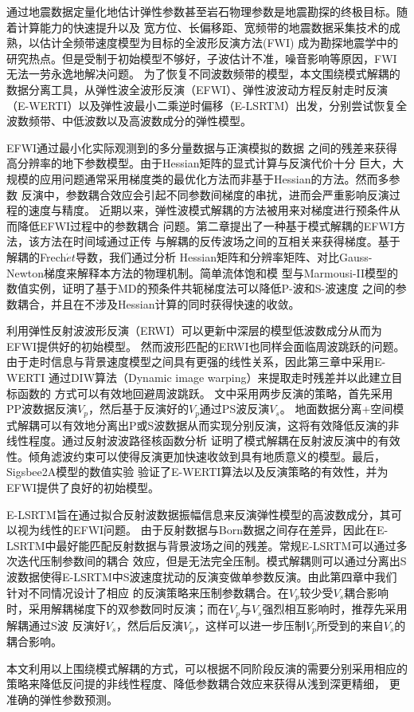 \begin{cabstract}
	通过地震数据定量化地估计弹性参数甚至岩石物理参数是地震勘探的终极目标。随着计算能力的快速提升以及
	宽方位、长偏移距、宽频带的地震数据采集技术的成熟，以估计全频带速度模型为目标的全波形反演方法(FWI)
	成为勘探地震学中的研究热点。但是受制于初始模型不够好，子波估计不准，噪音影响等原因，FWI无法一劳永逸地解决问题。
	为了恢复不同波数频带的模型，本文围绕模式解耦的数据分离工具，从弹性波全波形反演（EFWI）、弹性波波动方程反射走时反演
	（E-WERTI）以及弹性波最小二乘逆时偏移（E-LSRTM）出发，分别尝试恢复全波数频带、中低波数以及高波数成分的弹性模型。

	EFWI通过最小化实际观测到的多分量数据与正演模拟的数据
	之间的残差来获得高分辨率的地下参数模型。由于Hessian矩阵的显式计算与反演代价十分
	巨大，大规模的应用问题通常采用梯度类的最优化方法而非基于Hessian的方法。然而多参数
	反演中，参数耦合效应会引起不同参数间梯度的串扰，进而会严重影响反演过程的速度与精度。
	近期以来，弹性波模式解耦的方法被用来对梯度进行预条件从而降低EFWI过程中的参数耦合
	问题。第二章提出了一种基于模式解耦的EFWI方法，该方法在时间域通过正传
	与解耦的反传波场之间的互相关来获得梯度。基于解耦的Frech$\acute{e}t$导数，我们通过分析
	Hessian矩阵和分辨率矩阵、对比Gauss-Newton梯度来解释本方法的物理机制。简单流体饱和模
	型与Marmousi-II模型的数值实例，证明了基于MD的预条件共轭梯度法可以降低P-波和S-波速度
	之间的参数耦合，并且在不涉及Hessian计算的同时获得快速的收敛。

	利用弹性反射波波形反演（ERWI）可以更新中深层的模型低波数成分从而为EFWI提供好的初始模型。
	然而波形匹配的ERWI也同样会面临周波跳跃的问题。由于走时信息与背景速度模型之间具有更强的线性关系，因此第三章中采用E-WERTI
	通过DIW算法（Dynamic image warping）来提取走时残差并以此建立目标函数的
	方式可以有效地回避周波跳跃。
	文中采用两步反演的策略，首先采用PP波数据反演$V_p$，然后基于反演好的$V_p$通过PS波反演$V_s$。
	地面数据分离+空间模式解耦可以有效地分离出P或S波数据从而实现分别反演，这将有效降低反演的非线性程度。通过反射波波路径核函数分析
	证明了模式解耦在反射波反演中的有效性。倾角滤波约束可以使得反演更加快速收敛到具有地质意义的模型。最后，Sigsbee2A模型的数值实验
	验证了E-WERTI算法以及反演策略的有效性，并为EFWI提供了良好的初始模型。

	E-LSRTM旨在通过拟合反射波数据振幅信息来反演弹性模型的高波数成分，其可以视为线性的EFWI问题。
	由于反射数据与Born数据之间存在差异，因此在E-LSRTM中最好能匹配反射数据与背景波场之间的残差。常规E-LSRTM可以通过多次迭代压制参数间的耦合
	效应，但是无法完全压制。模式解耦则可以通过分离出S波数据使得E-LSRTM中S波速度扰动的反演变做单参数反演。由此第四章中我们针对不同情况设计了相应
	的反演策略来压制参数耦合。在$V_p$较少受$V_s$耦合影响时，采用解耦梯度下的双参数同时反演；而在$V_p$与$V_s$强烈相互影响时，推荐先采用解耦通过S波
	反演好$V_s$，然后后反演$V_p$，这样可以进一步压制$V_p$所受到的来自$V_s$的耦合影响。

	本文利用以上围绕模式解耦的方式，可以根据不同阶段反演的需要分别采用相应的策略来降低反问提的非线性程度、降低参数耦合效应来获得从浅到深更精细，
	更准确的弹性参数预测。


\end{cabstract}

